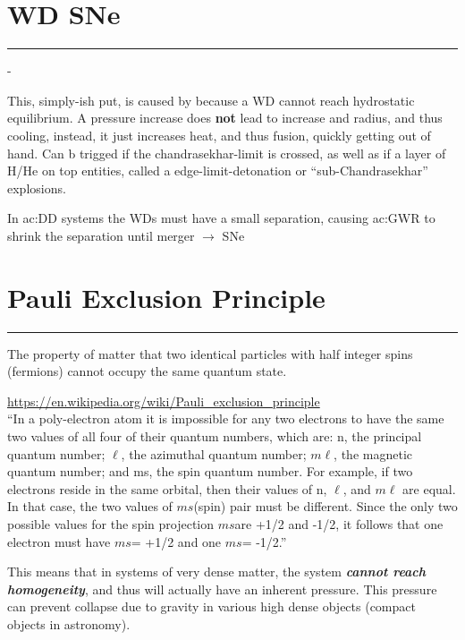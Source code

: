 \section{WD SNe}\label{WD-SNe}
\hrule
\vspace{.5cm}
\begin{list}{-}{}
\item This, simply-ish put, is caused by because a WD cannot reach hydrostatic equilibrium. A pressure increase does \textbf{not} lead to increase and radius, and thus cooling, instead, it just increases heat, and thus fusion, quickly getting out of hand. Can b trigged if the \gls{chandrasekhar-limit} is crossed, as well as if a layer of H/He on top entities, called a \gls{edge-limit-detonation} or ``sub-Chandrasekhar'' explosions.
\item In \gls{ac:DD} systems the WDs must have a small separation, causing \gls{ac:GWR} to shrink the separation until merger \(\rightarrow\) SNe
\end{list}

\section{Pauli Exclusion Principle}\label{pauli-exclusion-principle}
\hrule
\vspace{.5cm}
The property of matter that two identical particles with half integer spins (fermions) cannot occupy the same quantum state. \\
\begin{quoteBox}
\url{https://en.wikipedia.org/wiki/Pauli_exclusion_principle} \\ 
``In a poly-electron atom it is impossible for any two electrons to have the same two values of all four of their quantum numbers, which are: n, the principal quantum number; \(\ell\), the azimuthal quantum number; \(m\ell\), the magnetic quantum number; and ms, the spin quantum number. For example, if two electrons reside in the same orbital, then their values of n, \(\ell\), and \(m\ell\) are equal. In that case, the two values of \(ms\)(spin) pair must be different. Since the only two possible values for the spin projection \(ms\)are +1/2 and -1/2, it follows that one electron must have \(ms\)= +1/2 and one \(ms\)= -1/2.''
\end{quoteBox}
This means that in systems of very dense matter, the system \textit{\textbf{{cannot reach homogeneity}}}, and thus will actually have an inherent pressure. This pressure can prevent collapse due to gravity in various high dense objects (compact objects in astronomy).

